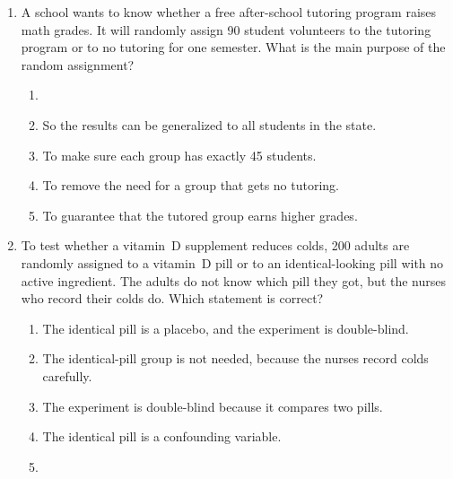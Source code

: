\documentclass[12pt]{article}
\begin{document}
\begin{enumerate}[leftmargin=1.9em, itemsep=0.13in]
  \boxguard[14]
  \item A school wants to know whether a free after-school tutoring program raises math grades.
        It will randomly assign 90 student volunteers to the tutoring program or to no tutoring
        for one semester. What is the main purpose of the random assignment?
        \begin{enumerate}[label=\textbf{(\Alph*)}, leftmargin=2.2em, itemsep=2pt]
          \item {}
          \item So the results can be generalized to all students in the state.
          \item To make sure each group has exactly 45 students.
          \item To remove the need for a group that gets no tutoring.
          \item To guarantee that the tutored group earns higher grades.\hfill{}\rule[-0.2in]{0pt}{0.48in}
        \end{enumerate}

  \boxguard[15]
  \item To test whether a vitamin~D supplement reduces colds, 200 adults are randomly assigned to
        a vitamin~D pill or to an identical-looking pill with no active ingredient. The adults
        do not know which pill they got, but the nurses who record their colds do. Which
        statement is correct?
        \begin{enumerate}[label=\textbf{(\Alph*)}, leftmargin=2.2em, itemsep=2pt]
          \item The identical pill is a placebo, and the experiment is double-blind.
          \item The identical-pill group is not needed, because the nurses record colds carefully.
          \item The experiment is double-blind because it compares two pills.
          \item The identical pill is a confounding variable.
          \item {}\hfill{}\rule[-0.2in]{0pt}{0.48in}
        \end{enumerate}


\end{enumerate}
\end{document}
